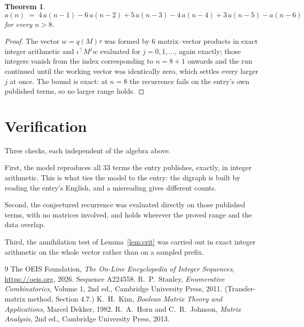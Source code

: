 \documentclass[11pt,a4paper]{article}
\theoremstyle{plain}
\newtheorem{theorem}{Theorem}
\theoremstyle{definition}
\begin{document}
\begin{theorem}
\[
a(n)\;=\;4\,a(n-1) - 6\,a(n-2) + 5\,a(n-3) - 4\,a(n-4) + 3\,a(n-5) - a(n-6)
\]
for every $n>8$.
\end{theorem}

\begin{proof}
The vector $w=q(M)\tau$ was formed by $6$ matrix--vector products in exact integer
arithmetic and $\iota^{\!\top}M^{j}w$ evaluated for $j=0,1,\dots$, again exactly; those
integers vanish from the index corresponding to $n=8+1$ onwards and the run continued
until the working vector was identically zero, which settles every larger $j$ at once. The bound is exact: at $n=8$ the recurrence fails on the entry's own published terms, so no larger range holds.
\end{proof}

\section{Verification}

Three checks, each independent of the algebra above.

First, the model reproduces all $33$ terms the entry publishes, exactly, in integer
arithmetic. This is what ties the model to the entry: the digraph is built by reading the
entry's English, and a misreading gives different counts.

Second, the conjectured recurrence was evaluated directly on those published terms, with no
matrices involved, and holds wherever the proved range and the data overlap.

Third, the annihilation test of Lemma~\ref{lem:crit} was carried out in exact integer
arithmetic on the whole vector rather than on a sampled prefix.

\begin{thebibliography}{9}
 The OEIS Foundation, \emph{The On-Line Encyclopedia of Integer
Sequences}, \url{https://oeis.org}, 2026. Sequence A224558.
 R.~P.~Stanley, \emph{Enumerative Combinatorics}, Volume 1, 2nd ed.,
Cambridge University Press, 2011. (Transfer-matrix method, Section 4.7.)
 K.~H.~Kim, \emph{Boolean Matrix Theory and Applications}, Marcel Dekker,
1982.
 R.~A.~Horn and C.~R.~Johnson, \emph{Matrix Analysis}, 2nd ed., Cambridge
University Press, 2013.
\end{thebibliography}
\end{document}
